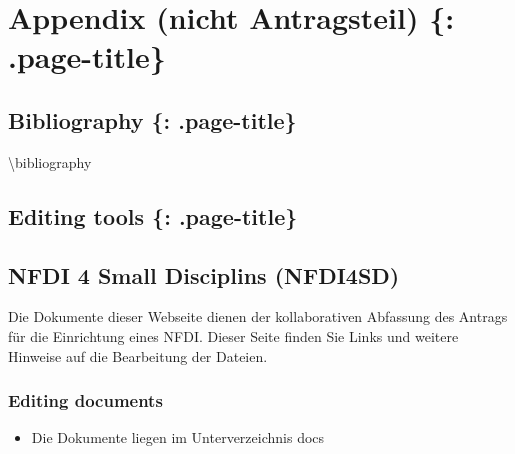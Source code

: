 \hypertarget{appendix-nicht-antragsteil-.page-title}{%
\section{Appendix (nicht Antragsteil) \{:
.page-title\}}\label{appendix-nicht-antragsteil-.page-title}}

\hypertarget{bibliography-.page-title}{%
\subsection{Bibliography \{:
.page-title\}}\label{bibliography-.page-title}}

⁠\textbackslash bibliography

\hypertarget{editing-tools-.page-title}{%
\subsection{Editing tools \{:
.page-title\}}\label{editing-tools-.page-title}}

\hypertarget{nfdi-4-small-disciplins-nfdi4sd-1}{%
\subsection{NFDI 4 Small Disciplins
(NFDI4SD)}\label{nfdi-4-small-disciplins-nfdi4sd-1}}

Die Dokumente dieser Webseite dienen der kollaborativen Abfassung des
Antrags für die Einrichtung eines NFDI. Dieser Seite finden Sie Links
und weitere Hinweise auf die Bearbeitung der Dateien.

\hypertarget{editing-documents}{%
\subsubsection{Editing documents}\label{editing-documents}}

\begin{itemize}
\tightlist
\item
  Die Dokumente liegen im Unterverzeichnis docs
\end{itemize}

\begin{Shaded}
\begin{Highlighting}[]
\OperatorTok{/}
\OperatorTok{/}
\OperatorTok{/}
\OperatorTok{/}
\end{Highlighting}
\end{Shaded}

